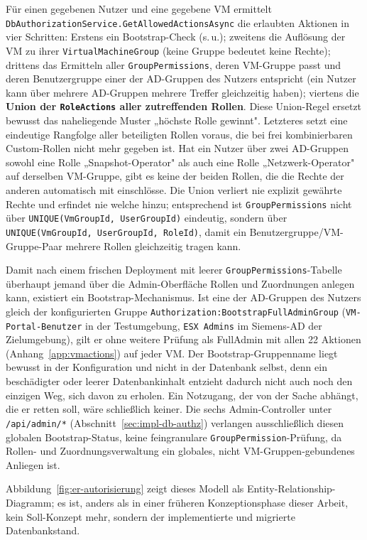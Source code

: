 \documentclass[12pt,a4paper]{article}
\begin{document}
Für einen gegebenen Nutzer und eine gegebene VM ermittelt \texttt{DbAuthorizationService.GetAllowedActionsAsync} die erlaubten Aktionen in vier Schritten: Erstens ein Bootstrap-Check (s.\,u.); zweitens die Auflösung der VM zu ihrer \texttt{VirtualMachineGroup} (keine Gruppe bedeutet keine Rechte); drittens das Ermitteln aller \texttt{GroupPermissions}, deren VM-Gruppe passt und deren Benutzergruppe einer der AD-Gruppen des Nutzers entspricht (ein Nutzer kann über mehrere AD-Gruppen mehrere Treffer gleichzeitig haben); viertens die \textbf{Union der \texttt{RoleActions} aller zutreffenden Rollen}. Diese Union-Regel ersetzt bewusst das naheliegende Muster „höchste Rolle gewinnt". Letzteres setzt eine eindeutige Rangfolge aller beteiligten Rollen voraus, die bei frei kombinierbaren Custom-Rollen nicht mehr gegeben ist. Hat ein Nutzer über zwei AD-Gruppen sowohl eine Rolle „Snapshot-Operator" als auch eine Rolle „Netzwerk-Operator" auf derselben VM-Gruppe, gibt es keine der beiden Rollen, die die Rechte der anderen automatisch mit einschlösse. Die Union verliert nie explizit gewährte Rechte und erfindet nie welche hinzu; entsprechend ist \texttt{GroupPermissions} nicht über \texttt{UNIQUE(VmGroupId, UserGroupId)} eindeutig, sondern über \texttt{UNIQUE(VmGroupId, UserGroupId, RoleId)}, damit ein Benutzergruppe/VM-Gruppe-Paar mehrere Rollen gleichzeitig tragen kann.

Damit nach einem frischen Deployment mit leerer \texttt{GroupPermissions}-Tabelle überhaupt jemand über die Admin-Oberfläche Rollen und Zuordnungen anlegen kann, existiert ein Bootstrap-Mechanismus. Ist eine der AD-Gruppen des Nutzers gleich der konfigurierten Gruppe \texttt{Authorization:BootstrapFullAdminGroup} (\texttt{VM-Portal-Benutzer} in der Testumgebung, \texttt{ESX Admins} im Siemens-AD der Zielumgebung), gilt er ohne weitere Prüfung als FullAdmin mit allen 22 Aktionen (Anhang~\ref{app:vmactions}) auf jeder VM. Der Bootstrap-Gruppenname liegt bewusst in der Konfiguration und nicht in der Datenbank selbst, denn ein beschädigter oder leerer Datenbankinhalt entzieht dadurch nicht auch noch den einzigen Weg, sich davon zu erholen. Ein Notzugang, der von der Sache abhängt, die er retten soll, wäre schließlich keiner. Die sechs Admin-Controller unter \texttt{/api/admin/*} (Abschnitt~\ref{sec:impl-db-authz}) verlangen ausschließlich diesen globalen Bootstrap-Status, keine feingranulare \texttt{GroupPermission}-Prüfung, da Rollen- und Zuordnungsverwaltung ein globales, nicht VM-Gruppen-gebundenes Anliegen ist.

Abbildung~\ref{fig:er-autorisierung} zeigt dieses Modell als Entity-Relationship-Diagramm; es ist, anders als in einer früheren Konzeptionsphase dieser Arbeit, kein Soll-Konzept mehr, sondern der implementierte und migrierte Datenbankstand.
\end{document}
